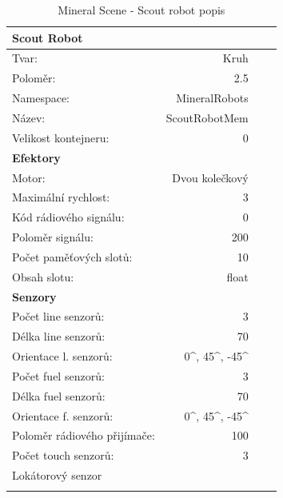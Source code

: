 \begin{table}[h]\centering
	\begin{tabular}{l@{\hspace{1.0cm}}D{.}{,}{2.2}D{.}{,}{2.2}D{.}{,}{2.3}}
		\toprule
		\textbf{Scout Robot} \\
		\midrule
		Tvar: & Kruh\\
		Poloměr: & 2.5\\
		Namespace: & MineralRobots\\
		Název: & ScoutRobotMem \\
		Velikost kontejneru: & 0\\
		\midrule
		\textbf{Efektory} \\
		\midrule
		Motor: & Dvou kolečkový \\
		Maximální rychlost: & 3 \\
		Kód rádiového signálu: & 0\\
		Poloměr signálu: & 200\\
		Počet paměťových slotů: &10 \\
		Obsah slotu: & float\\
		\midrule
		\textbf{Senzory} \\
		\midrule
		Počet line senzorů: &  3\\
		Délka line senzorů: & 70\\
		Orientace l. senzorů: & 0^\circ, 45^\circ, -45^\circ\\
		Počet fuel senzorů: &  3\\
		Délka fuel senzorů: & 70\\
		Orientace f. senzorů: & 0^\circ, 45^\circ, -45^\circ\\
		Poloměr rádiového přijímače: & 100 \\
		Počet touch senzorů: & 3 \\  
		Lokátorový senzor\\ 
		\bottomrule
	\end{tabular}
	\caption{Mineral Scene - Scout robot popis }
	\label{tab04:MineralScout}
\end{table}
\clearpage
